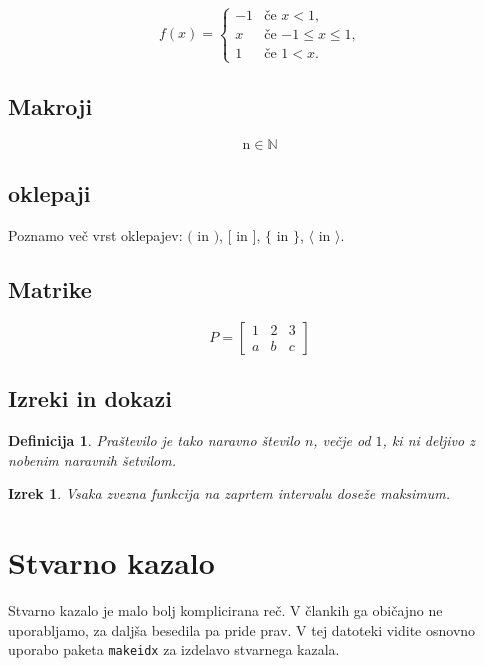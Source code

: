 \documentclass[a4paper, 10pt]{article}
\newtheorem{definicija}{Definicija}
\newtheorem{izrek}{Izrek}
\begin{document}
\[
  f(x) =
  \begin{cases}
    -1 & \text{če $x < 1$,} \\
     x & \text{če $-1 \leq x \leq 1$,} \\
     1 & \text{če $1 < x$.}
  \end{cases}
\]

\subsection{Makroji}
\newcommand{\NN}{\mathbb{N}} %
\[ \text{n} \in \NN\]

\subsection{oklepaji}
Poznamo več vrst oklepajev: $($ in $)$, $[$ in $]$, $\{$ in $\}$, $\langle$ in $\rangle$.


\subsection{Matrike}

\[
P =
\begin{bmatrix}
    1 & 2 & 3\\
    a & b & c
\end{bmatrix}
\]

\subsection{Izreki in dokazi}

\begin{definicija}
    \emph{Praštevilo} je tako naravno število $n$, večje od $1$, ki ni deljivo z nobenim
    naravnih šetvilom.
\end{definicija}

\begin{izrek}
    Vsaka zvezna funkcija na zaprtem intervalu doseže maksimum.
\end{izrek}


\section{Stvarno kazalo}
Stvarno kazalo%
%
je malo bolj komplicirana reč. V člankih ga običajno ne uporabljamo, za daljša besedila pa
pride prav. V tej datoteki vidite osnovno uporabo paketa \texttt{makeidx} za izdelavo
stvarnega kazala.
\end{document}
